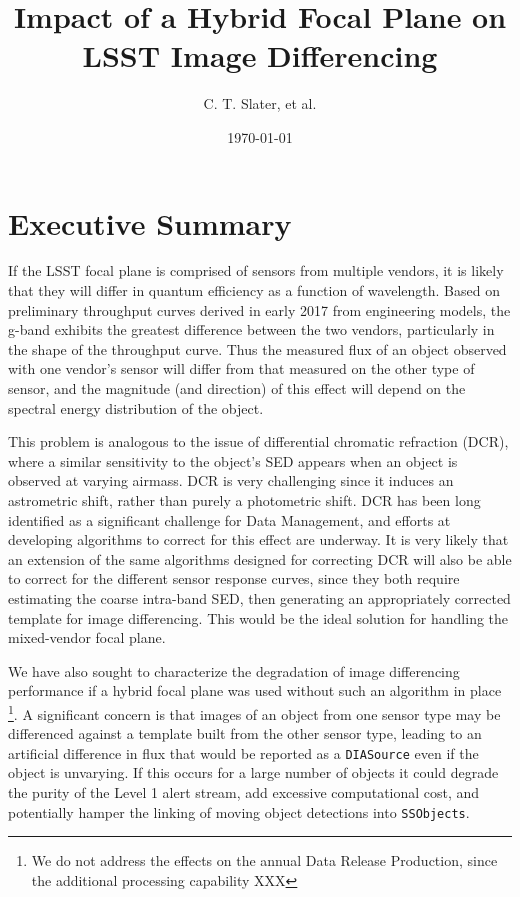 \documentclass[12pt]{article}
\title{Impact of a Hybrid Focal Plane on LSST Image Differencing}
\author{C. T. Slater, et al. }
\newcommand{\code}[1]{\texttt{#1}}
\newcommand{\DIASource}{\code{DIASource}\xspace}
\newcommand{\SSObjects}{\code{SSObjects}\xspace}
\begin{document}
\date{\today}
\maketitle


\section{Executive Summary}

If the LSST focal plane is comprised of sensors from multiple vendors, it is
likely that they will differ in quantum efficiency as a function of wavelength.
Based on preliminary throughput curves derived in early 2017 from engineering
models, the g-band exhibits the greatest difference between the two vendors,
particularly in the shape of the throughput curve. Thus the measured flux of an
object observed with one vendor's sensor will differ from that measured on the
other type of sensor, and the magnitude (and direction) of this effect will
depend on the spectral energy distribution of the object.

This problem is analogous to the issue of differential chromatic refraction (DCR),
where a similar sensitivity to the object's SED appears when an object is
observed at varying airmass. DCR is very challenging since it induces an
astrometric shift, rather than purely a photometric shift. DCR has been long
identified as a significant challenge for Data Management, and efforts at
developing algorithms to correct for this effect are underway. It is very likely
that an extension of the same algorithms designed for correcting DCR will also
be able to correct for the different sensor response curves, since they both
require estimating the coarse intra-band SED, then generating an appropriately
corrected template for image differencing. This would be the ideal solution for
handling the mixed-vendor focal plane.

We have also sought to characterize the degradation of image differencing
performance if a hybrid focal plane was used without such an algorithm in place
\footnote{We do not address the effects on the annual Data
Release Production, since the additional processing capability XXX}.
A significant concern is that images of an object from one sensor type may be
differenced against a template built from the other sensor type, leading to an
artificial difference in flux that would be reported as a \DIASource even if the
object is unvarying. If this occurs for a large number of objects it could
degrade the purity of the Level 1 alert stream, add excessive computational
cost, and potentially hamper the linking of moving object detections into
\SSObjects.
\end{document}
